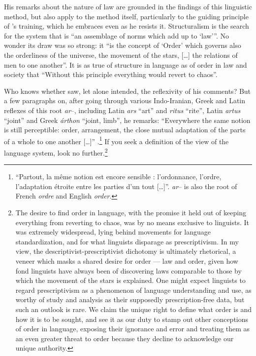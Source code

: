 \documentclass[output=paper]{langscibook}
\begin{document}
His remarks about the nature of law are grounded in the findings of this linguistic method, but also apply to the method itself, particularly to the guiding principle of {\Benveniste}'s training, which he embraces even as he resists it. Structuralism is the search for the system that is ``an assemblage of norms which add up to `law'\thinspace''. No wonder its draw was so strong: it ``is the concept of `Order' which governs also the orderliness of the universe, the movement of the stars, […] the relations of men to one another''. It is as true of structure in language as of order in law and society that ``Without this principle everything would revert to chaos''.

Who knows whether {\Benveniste} saw, let alone intended, the reflexivity of his comments? But a few paragraphs on, after going through various Indo-Iranian, Greek and Latin reflexes of this root \emph{ar}--, including Latin \emph{ars} ``art'' and \emph{ritus} ``rite'', Latin \emph{artus} ``joint'' and Greek \emph{árthon} ``joint, limb'', he remarks: ``Everywhere the same notion is still perceptible: order, arrangement, the close mutual adaptation of the parts of a whole to one another […]'' \citep[101]{Benveniste1969vocabulaire}.\footnote{``Partout, la même notion est encore sensible : l'ordonnance, l'ordre, l'adaptation étroite entre les parties d'un tout […]''. \emph{ar}-- is also the root of French \emph{ordre} and English \emph{order}.} If you seek a definition of the  view of the language system, look no further.\footnote{The desire to find order in language, with the promise it held out of keeping everything from reverting to chaos, was by no means exclusive to linguists. It was extremely widespread, lying behind movements for language standardization, and for what linguists disparage as prescriptivism. In my view, the descriptivist-prescriptivist dichotomy is ultimately rhetorical, a veneer which masks a shared desire for order — law and order, given how fond linguists have always been of discovering laws comparable to those by which the movement of the stars is explained. One might expect linguists to regard prescriptivism as a phenomenon of language understanding and use, as worthy of study and analysis as their supposedly prescription-free data, but such an outlook is rare. We claim the unique right to define what order is and how it is to be sought, and see it as our duty to stamp out other conceptions of order in language, exposing their ignorance and error and treating them as an even greater threat to order because they decline to acknowledge our unique authority.}
\end{document}
